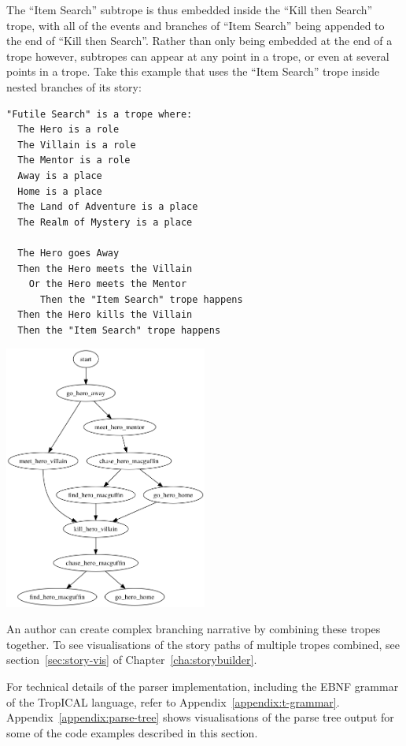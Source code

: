 \documentclass[11pt]{report}
\begin{document}
The ``Item Search'' subtrope is thus embedded inside the ``Kill then Search''
trope, with all of the events and branches of ``Item Search'' being appended to
the end of ``Kill then Search''. Rather than only being embedded at the end of a
trope however, subtropes can appear at any point in a trope, or even at several
points in a trope. Take this example that uses the ``Item Search'' trope inside
nested branches of its story:

\begin{lstlisting}[showstringspaces=false, label={lst:subtrope3}, caption={Subtrope in multiple places}]
"Futile Search" is a trope where:
  The Hero is a role
  The Villain is a role
  The Mentor is a role
  Away is a place
  Home is a place
  The Land of Adventure is a place
  The Realm of Mystery is a place

  The Hero goes Away
  Then the Hero meets the Villain
    Or the Hero meets the Mentor
      Then the "Item Search" trope happens
  Then the Hero kills the Villain
  Then the "Item Search" trope happens
\end{lstlisting}

\vspace{7mm}
\centerline{\includegraphics[width=0.5\textwidth]{subtrope3.png}}
\vspace{7mm}

An author can create complex branching narrative by combining these tropes together. To see
visualisations of the story paths of multiple tropes combined, see
section~\ref{sec:story-vis} of Chapter~\ref{cha:storybuilder}.

For technical details of the parser implementation, including the EBNF grammar
of the TropICAL language, refer to Appendix~\ref{appendix:t-grammar}.
Appendix~\ref{appendix:parse-tree} shows visualisations of the parse tree output for some
of the code examples described in this section.
\end{document}
